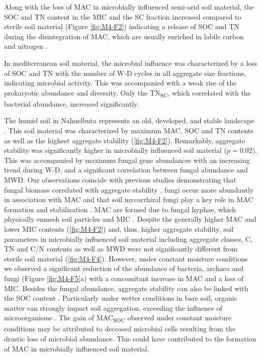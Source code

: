 Along with the loss of MAC in microbially influenced semi-arid soil material, the SOC and TN content in the MIC and the SC fraction increased compared to sterile soil material (Figure \ref{fig:M4-F2}) indicating a release of SOC and TN during the disintegration of MAC, which are usually enriched in labile carbon and nitrogen \citep{Marx2005}.

In mediterranean soil material, the microbial influence was characterized by a loss of SOC and TN with the number of W-D cycles in all aggregate size fractions, indicating microbial activity. This was accompanied with a weak rise of the prokaryotic abundance and diversity. Only the TN\textsubscript{SC}, which correlated with the bacterial abundance, increased significantly.

The humid soil in Nahuelbuta represents an old, developed, and stable landscape \citep{Mucina2011}. This soil material was characterized by maximum MAC, SOC and TN contents as well as the highest aggregate stability (\ref{fig:M4-F2}). Remarkably, aggregate stability was significantly higher in microbially influenced soil material (\(p = 0.02\)). This was accompanied by maximum fungal gene abundances with an increasing trend during W-D, and a significant correlation between fungal abundance and MWD. Our observations coincide with previous studies demonstrating that fungal biomass correlated with aggregate stability \citep{Cosentino2006}, fungi occur more abundantly in association with MAC \citep{Kihara2012} and that soil mycorrhizal fungi play a key role in MAC formation and stabilization \citep{Chotte2005}. MAC are formed due to fungal hyphae, which physically enmesh soil particles and MIC \citep{Davinic2012}. Despite the generally higher MAC and lower MIC contents (\ref{fig:M4-F2}) and, thus, higher aggregate stability, soil parameters in microbially influenced soil material including aggregate classes, C, TN and C/N contents as well as MWD were not significantly different from sterile soil material (\ref{fig:M4-F4}). However, under constant moisture conditions we observed a significant reduction of the abundance of bacteria, archaea and fungi (Figure \ref{fig:M4-F5}a) with a concomitant increase in MAC and a loss of MIC. Besides the fungal abundance, aggregate stability can also be linked with the SOC content \citep{AlKaisi2014}. Particularly under wetter conditions in bare soil, organic matter can strongly impact soil aggregation, exceeding the influence of microorganisms \citep{RiverasMunoz2022}. The gain of MAC\textsubscript{SOC} observed under constant moisture conditions may be attributed to deceased microbial cells resulting from the drastic loss of microbial abundance. This could have contributed to the formation of MAC in microbially influenced soil material.

